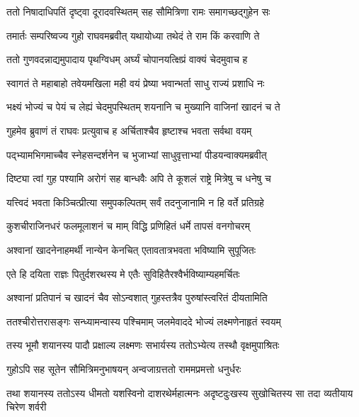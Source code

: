 \twolineshloka
{ततो निषादाधिपतिं दृष्ट्वा दूरादवस्थितम्}
{सह सौमित्रिणा रामः समागच्छद्गुहेन सः} %

\twolineshloka
{तमार्तः सम्परिष्वज्य गुहो राघवमब्रवीत्}
{यथायोध्या तथेदं ते राम किं करवाणि ते} %

\twolineshloka
{ततो गुणवदन्नाद्यमुपादाय पृथग्विधम्}
{अर्घ्यं चोपानयत्क्षिप्रं वाक्यं चेदमुवाच ह} %

\twolineshloka
{स्वागतं ते महाबाहो तवेयमखिला मही}
{वयं प्रेष्या भवान्भर्ता साधु राज्यं प्रशाधि नः} %

\twolineshloka
{भक्ष्यं भोज्यं च पेयं च लेह्यं चेदमुपस्थितम्}
{शयनानि च मुख्यानि वाजिनां खादनं च ते} %

\twolineshloka
{गुहमेव ब्रुवाणं तं राघवः प्रत्युवाच ह}
{अर्चिताश्चैव हृष्टाश्च भवता सर्वथा वयम्} %

\twolineshloka
{पद्भ्यामभिगमाच्चैव स्नेहसन्दर्शनेन च}
{भुजाभ्यां साधुवृत्ताभ्यां पीडयन्वाक्यमब्रवीत्} %

\twolineshloka
{दिष्ट्या त्वां गुह पश्यामि अरोगं सह बान्धवैः}
{अपि ते कूशलं राष्ट्रे मित्रेषु च धनेषु च} %

\twolineshloka
{यत्त्विदं भवता किञ्चित्प्रीत्या समुपकल्पितम्}
{सर्वं तदनुजानामि न हि वर्ते प्रतिग्रहे} %

\twolineshloka
{कुशचीराजिनधरं फलमूलाशनं च माम्}
{विद्धि प्रणिहितं धर्मे तापसं वनगोचरम्} %

\twolineshloka
{अश्वानां खादनेनाहमर्थी नान्येन केनचित्}
{एतावतात्रभवता भविष्यामि सुपूजितः} %

\twolineshloka
{एते हि दयिता राज्ञः पितुर्दशरथस्य मे}
{एतैः सुविहितैरश्वैर्भविष्याम्यहमर्चितः} %

\twolineshloka
{अश्वानां प्रतिपानं च खादनं चैव सोऽन्वशात्}
{गुहस्तत्रैव पुरुषांस्त्वरितं दीयतामिति} %

\twolineshloka
{ततश्चीरोत्तरासङ्गः सन्ध्यामन्वास्य पश्चिमाम्}
{जलमेवाददे भोज्यं लक्ष्मणेनाहृतं स्वयम्} %

\twolineshloka
{तस्य भूमौ शयानस्य पादौ प्रक्षाल्य लक्ष्मणः}
{सभार्यस्य ततोऽभ्येत्य तस्थौ वृक्षमुपाश्रितः} %

\twolineshloka
{गुहोऽपि सह सूतेन सौमित्रिमनुभाषयन्}
{अन्वजाग्रत्ततो राममप्रमत्तो धनुर्धरः} %

\fourlineindentedshloka
{तथा शयानस्य ततोऽस्य धीमतो}
{यशस्विनो दाशरथेर्महात्मनः}
{अदृष्टदुःखस्य सुखोचितस्य सा}
{तदा व्यतीयाय चिरेण शर्वरी} %


